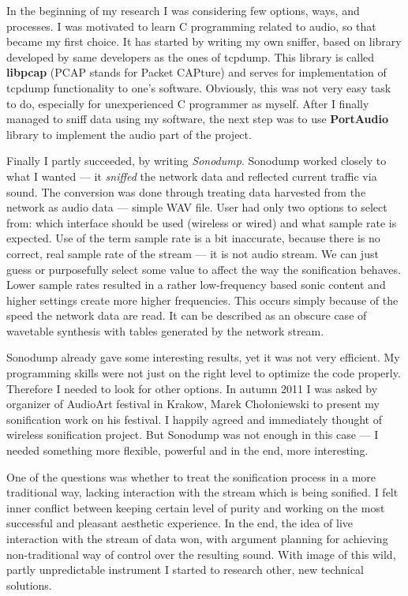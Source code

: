 \documentclass[12pt,a4paper,oneside]{report}
\begin{document}
In the beginning of my research I was considering few options, ways, and processes. I was motivated to learn C programming related to audio, so that became my first choice. It has started by writing my own sniffer, based on library developed by same developers as the ones of tcpdump. This library is called \textbf{libpcap} (PCAP stands for Packet CAPture) and serves for implementation of tcpdump functionality to one's software. Obviously, this was not very easy task to do, especially for unexperienced C programmer as myself. After I finally managed to sniff data using my software, the next step was to use \textbf{PortAudio} library to implement the audio part of the project.

Finally I partly succeeded, by writing \emph{Sonodump}. Sonodump worked closely to what I wanted --- it \emph{sniffed} the network data and reflected current traffic via sound. The conversion was done through treating data harvested from the network as audio data --- simple WAV file. User had only two options to select from: which interface should be used (wireless or wired) and what sample rate is expected. Use of the term sample rate is a bit inaccurate, because there is no correct, real sample rate of the stream --- it is not audio stream. We can just guess or purposefully select some value to affect the way the sonification behaves. Lower sample rates resulted in a rather low-frequency based sonic content and higher settings create more higher frequencies. This occurs simply because of the speed the network data are read. It can be described as an obscure case of wavetable synthesis with tables generated by the network stream.

Sonodump already gave some interesting results, yet it was not very efficient. My programming skills were not just on the right level to optimize the code properly. Therefore I needed to look for other options. In autumn 2011 I was asked by organizer of AudioArt festival in Krakow, Marek Chołoniewski to present my sonification work on his festival. I happily agreed and immediately thought of wireless sonification project. But Sonodump was not enough in this case --- I needed something more flexible, powerful and in the end, more interesting.

One of the questions was whether to treat the sonification process in a more traditional way, lacking interaction with the stream which is being sonified. I felt inner conflict between keeping certain level of purity and working on the most successful and pleasant aesthetic experience. In the end, the idea of live interaction with the stream of data won, with argument planning for achieving non-traditional way of control over the resulting sound. With image of this wild, partly unpredictable instrument I started to research other, new technical solutions.
\end{document}
